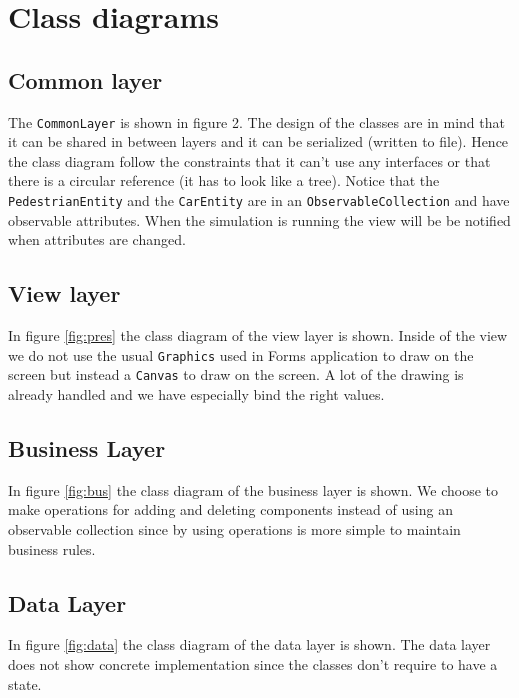 \section{Class diagrams}
\subsection{Common layer}
The \texttt{CommonLayer} is shown in figure 2. The design of the classes are in mind that it can be shared in between layers and it can be serialized (written to file). Hence the class diagram follow the constraints that it can't use any interfaces or that there is a circular reference (it has to look like a tree). Notice that the 
\texttt{PedestrianEntity} and the \texttt{CarEntity} are in an \texttt{ObservableCollection} and have observable attributes. When the simulation is running the view will be be notified when attributes are changed.

\subsection{View layer}
In figure \ref{fig:pres} the class diagram of the view layer is shown. Inside of the view we do not use the usual \texttt{Graphics} used in Forms application to draw on the screen but instead a \texttt{Canvas} to draw on the screen. A lot of the drawing is already handled and we have especially bind the right values.

\subsection{Business Layer}
In figure \ref{fig:bus} the class diagram of the business layer is shown. We choose to make operations for adding and deleting components instead of using an observable collection since by using operations is more simple to maintain business rules. 

\subsection{Data Layer}
In figure \ref{fig:data} the class diagram of the data layer is shown. The data layer does not show concrete implementation since the classes don't require to have a state.

